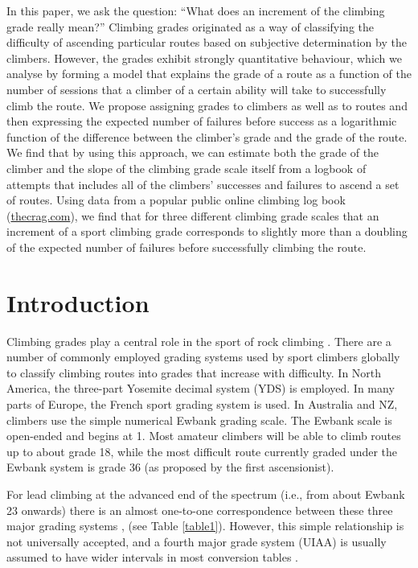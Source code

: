 \documentclass[12pt]{article}
\begin{document}
In this paper, we ask the question: ``What does an increment of the climbing grade really mean?''  Climbing grades originated as a way of classifying the difficulty of ascending particular routes based on subjective determination by the climbers.  However, the grades exhibit strongly quantitative behaviour, which we analyse by forming a model that explains the grade of a route as a function of the number of sessions that a climber of a certain ability will take to successfully climb the route. We propose assigning grades to climbers as well as to routes and then expressing the expected number of failures before success as a logarithmic function of the difference between the climber's grade and the grade of the route.  We find that by using this approach, we can estimate both the grade of the climber and the slope of the climbing grade scale itself from a logbook of attempts that includes all of the climbers' successes and failures to ascend a set of routes.  Using data from a popular public online climbing log book (\url{thecrag.com}), we find that for three different climbing grade scales that an increment of a sport climbing grade corresponds to slightly more than a doubling of the expected number of failures before successfully climbing the route.

\section{Introduction}

Climbing grades play a central role in the sport of rock climbing \citep{delignieres1993psychophysical,draper2015comparative}. There are a number of commonly employed grading systems used by sport climbers globally to classify climbing routes into grades that increase with difficulty.  In North America, the three-part Yosemite decimal system (YDS) is employed.  In many parts of Europe, the French sport grading system is used.  In Australia and NZ, climbers use the simple numerical Ewbank grading scale. The Ewbank scale is open-ended and begins at 1. Most amateur climbers will be able to climb routes up to about grade 18, while the most difficult route currently graded under the Ewbank system is grade 36 (as proposed by the first ascensionist). 

For lead climbing at the advanced end of the spectrum (i.e., from about Ewbank 23 onwards) there is an almost one-to-one correspondence between these three major grading systems \citep{draper2015comparative}, (see Table \ref{table1}).  However, this simple relationship is not universally accepted, and a fourth major grade system (UIAA) is usually assumed to have wider intervals in most conversion tables \citep{draper2015comparative}.
\end{document}
